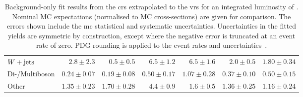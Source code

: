 \begin{table}
\begin{center}
{\begin{tabular}{lrrrrrr}
        $W+\mathrm{jets}$        & $2.8 \pm 2.3$          & $0.5 \pm 0.5$          & $6.5 \pm 1.2$    & $6.5 \pm 1.6$          & $2.0 \pm 0.5$          & $1.80 \pm 0.34$              \\
        Di-/Multiboson       & $0.24 \pm 0.07$          & $0.19 \pm 0.08$          & $0.50 \pm 0.17$     & $1.07 \pm 0.28$          & $0.37 \pm 0.10$          & $0.50 \pm 0.15$              \\
        Other       & $1.35 \pm 0.23$          & $1.70 \pm 0.28$          & $4.4 \pm 0.9$    & $1.6 \pm 0.5$          & $1.36 \pm 0.25$          & $1.16 \pm 0.24$              \\
\bottomrule
\end{tabular}
}
\end{center}
\caption{ Background-only fit results from the \glspl{cr} extrapolated to the \glspl{vr} for an integrated luminosity of \onethirtynineifb. Nominal MC expectations (normalised to MC cross-sections) are given for comparison. The errors shown include the \gls{mc} statistical and systematic uncertainties. Uncertainties in the fitted yields are symmetric by construction, except where the negative error is truncated at an event rate of zero. PDG rounding is applied to the event rates and uncertainties~\cite{pdg2020}.}
\label{tab:results_bkg_only_VR}
\end{table}
%